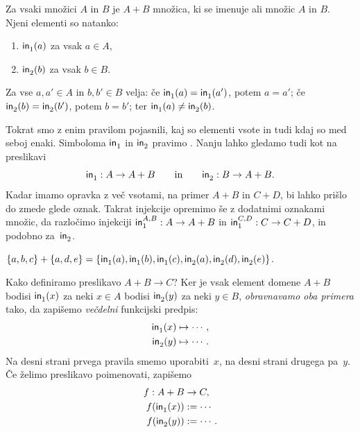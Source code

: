 \begin{pravilo}
  \label{vsota:tvorba}
  Za vsaki množici $A$ in $B$ je $A + B$ množica, ki se imenuje  ali
   množic $A$ in $B$.
  Njeni elementi so natanko:
  \begin{enumerate}
  \item $\inl(a)$ za vsak $a \in A$,
  \item $\inr(b)$ za vsak $b \in B$.
  \end{enumerate}
  Za vse $a, a' \in A$ in $b, b' \in B$ velja:
  če $\inl(a) = \inl(a')$, potem $a = a'$; če $\inr(b) = \inr(b')$, potem $b = b'$; ter $\inl(a) \neq \inr(b)$.
\end{pravilo}

Tokrat smo z enim pravilom pojasnili, kaj so elementi vsote in tudi kdaj so med seboj enaki.
%
Simboloma $\inl$ in $\inr$ pravimo . Nanju lahko gledamo tudi kot na preslikavi
%
\begin{equation*}
  \inl : A \to A + B
  \qquad\text{in}\qquad
  \inr : B \to A + B.
\end{equation*}
%
Kadar imamo opravka z več vsotami, na primer $A + B$ in $C + D$, bi lahko prišlo do
zmede glede oznak. Takrat injekcije opremimo še z dodatnimi oznakami množic, da razločimo
injekciji $\inl[A][B] : A \to A + B$ in $\inl[C][D] : C \to C + D$, in podobno za~$\inr$.

\begin{zgled}
%
$
\set{a, b, c} + \set{a, d, e} =
\set{\inl(a), \inl(b), \inl(c), \inr(a), \inr(d), \inr(e)}
$.
\end{zgled}

Kako definiramo preslikavo $A + B \to C$? Ker je vsak element domene $A + B$ bodisi
$\inl(x)$ za neki $x \in A$ bodisi $\inr(y)$ za neki $y \in B$, \emph{obravnavamo oba
  primera} tako, da zapišemo \emph{večdelni} funkcijski predpis:
%
\begin{align*}
  \inl(x) &\mapsto \cdots, \\
  \inr(y) &\mapsto \cdots.
\end{align*}
%
Na desni strani prvega pravila smemo uporabiti~$x$, na desni strani drugega pa~$y$.
Če želimo preslikavo poimenovati, zapišemo
%
\begin{align*}
  f : A + B &\to C, \\
  f(\inl(x)) &\dfeq \cdots\\
  f(\inr(y)) &\dfeq \cdots.
\end{align*}

